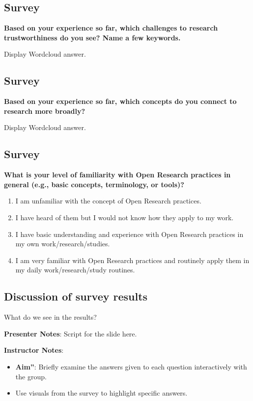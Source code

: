 \documentclass[
  letterpaper,
  DIV=11,
  numbers=noendperiod]{scrartcl}
\begin{document}
\subsection{Survey}\label{survey-1}

\textbf{Based on your experience so far, which challenges to research
trustworthiness do you see? Name a few keywords.}

Display Wordcloud answer.

\subsection{Survey}\label{survey-2}

\textbf{Based on your experience so far, which concepts do you connect
to research more broadly?}

Display Wordcloud answer.

\subsection{Survey}\label{survey-3}

\textbf{What is your level of familiarity with Open Research practices
in general (e.g., basic concepts, terminology, or tools)?}

\begin{enumerate}
\def\labelenumi{\alph{enumi}.}
\item
  I am unfamiliar with the concept of Open Research practices.
\item
  I have heard of them but I would not know how they apply to my work.
\item
  I have basic understanding and experience with Open Research practices
  in my own work/research/studies.
\item
  I am very familiar with Open Research practices and routinely apply
  them in my daily work/research/study routines.
\end{enumerate}

\subsection{Discussion of survey
results}\label{discussion-of-survey-results}

What do we see in the results?

\textbf{Presenter Notes}: Script for the slide here.

\textbf{Instructor Notes}:

\begin{itemize}
\item
  \textbf{Aim''}: Briefly examine the answers given to each question
  interactively with the group.
\item
  Use visuals from the survey to highlight specific answers.
\end{itemize}
\end{document}
